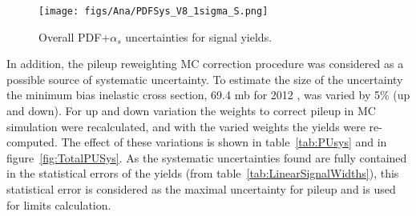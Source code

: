 \begin{table*}[htbH]
\begin{center}
\caption{PDF+$\alpha_{s}$ uncertainties for signal yields.\label{tab:PDFsys}}
\end{center}
\end{table*}

\begin{figure}[!Hhtbp]
  \begin{center}
    \texttt{[image: figs/Ana/PDFSys\_V8\_1sigma\_S.png]}
    \caption{Overall PDF+$\alpha_{s}$ uncertainties for signal yields.}
    \label{fig:TotalPDFSys}
  \end{center}
\end{figure}

In addition, the pileup reweighting MC correction procedure was considered as a possible source of systematic uncertainty. To estimate the size of the uncertainty the minimum bias inelastic cross section, 69.4 mb for 2012 , was varied by 5\% (up and down). For up and down variation the weights to correct pileup in MC simulation were recalculated, and with the varied weights the yields were re-computed. The effect of these variations is shown in table~\ref{tab:PUsys} and in figure~\ref{fig:TotalPUSys}. As the systematic uncertainties found are fully contained in the statistical errors of the yields (from table~\ref{tab:LinearSignalWidths}), this statistical error is considered as the maximal uncertainty for pileup and is used for limits calculation. %

